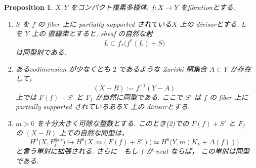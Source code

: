 \documentclass[dvipdfmx,a4paper,11pt]{article} %
\newtheorem{prop}[thm]{Proposition}
\theoremstyle{definition}
\theoremstyle{remark}
\numberwithin{equation}{section}
\begin{document}
\begin{prop}\cite[Proposition 1.22, 1.23, 1.24]{Cam04}
\(X, Y\) をコンパクト複素多様体, 
\(f : X \rightarrow Y\) をfibrationとする. 

\begin{enumerate}
\item  \(S\) を \(f\) の fiber 上に partially supported されている\(X\) 上の divisorとする.  \(L\) を \(Y\) 上の 直線束とすると, 
 sheaf の自然な射
\[
L \subset f_*\bigl(f^*(L) + S\bigr)
\]
は同型射である.
\item あるcodimension が少なくとも \(2\) であるような Zariski 閉集合 \(A \subset Y\) が存在して，
\[
(X - B) := f^{-1}(Y - A)
\]
上では \(F(f) + S'\) と \(F_f\) が自然に同型である.
ここで \(S'\) は \(f\) の fiber 上に partially supported されているある\(X\) 上の divisorとする.
\item 
\(m>0\) を十分大きく可除な整数とする.
このとき(2)での \(F(f)+S'\) と \(F_f\) の \((X-B)\) 上での自然な同型は，
\[
H^0\bigl(X,F_f^{\otimes m}\bigr)
 \hookrightarrow H^0\bigl(X,m(F(f)+S')\bigr)
 \simeq H^0\bigl(Y,m(K_Y + \Delta(f))\bigr)
\]
と言う単射に拡張される. 
さらに　もし \(f\) が neat ならば， この単射は同型である.
\end{enumerate}
\end{prop}
\end{document}
